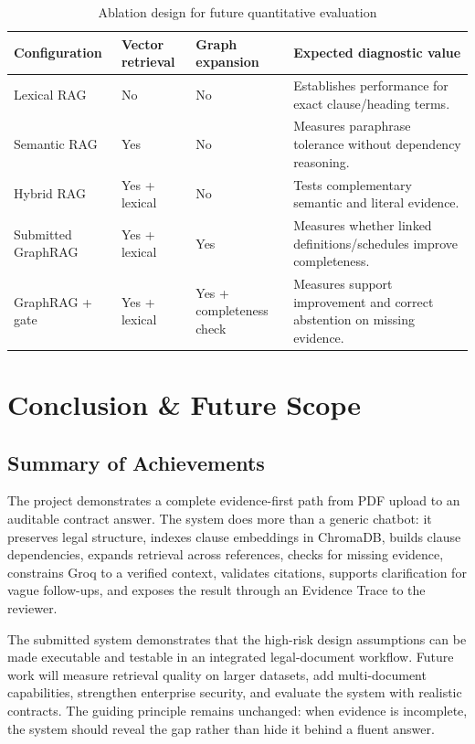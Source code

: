 \documentclass[12pt,a4paper,oneside]{report}
\begin{document}
\begin{table}[H]
\centering
\begin{tabularx}{\textwidth}{p{}p{}p{}X}
\toprule
\textbf{Configuration} & \textbf{Vector retrieval} & \textbf{Graph expansion} & \textbf{Expected diagnostic value}\\
\midrule
Lexical RAG & No & No & Establishes performance for exact clause/heading terms.\\
Semantic RAG & Yes & No & Measures paraphrase tolerance without dependency reasoning.\\
Hybrid RAG & Yes + lexical & No & Tests complementary semantic and literal evidence.\\
Submitted GraphRAG & Yes + lexical & Yes & Measures whether linked definitions/schedules improve completeness.\\
GraphRAG + gate & Yes + lexical & Yes + completeness check & Measures support improvement and correct abstention on missing evidence.\\
\bottomrule
\end{tabularx}
\caption{Ablation design for future quantitative evaluation}
\end{table}

\chapter{Conclusion \& Future Scope}
\section{Summary of Achievements}
The project demonstrates a complete evidence-first path from PDF upload to an auditable contract answer. The system does more than a generic chatbot: it preserves legal structure, indexes clause embeddings in ChromaDB, builds clause dependencies, expands retrieval across references, checks for missing evidence, constrains Groq to a verified context, validates citations, supports clarification for vague follow-ups, and exposes the result through an Evidence Trace to the reviewer.

The submitted system demonstrates that the high-risk design assumptions can be made executable and testable in an integrated legal-document workflow. Future work will measure retrieval quality on larger datasets, add multi-document capabilities, strengthen enterprise security, and evaluate the system with realistic contracts. The guiding principle remains unchanged: when evidence is incomplete, the system should reveal the gap rather than hide it behind a fluent answer.
\end{document}
